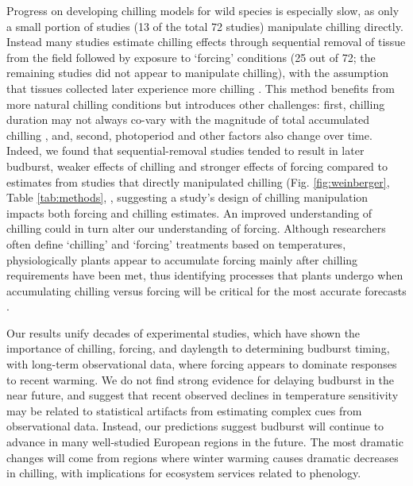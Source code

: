 \documentclass{article}
\begin{document}
\par Progress on developing chilling models for wild species is especially slow, as only a small portion of studies (13 of the total 72 studies) manipulate chilling directly. Instead many studies estimate chilling effects through sequential removal of tissue from the field followed by exposure to `forcing' conditions (25 out of 72; the remaining studies did not appear to manipulate chilling), with the assumption that tissues collected later experience more chilling \emph{\citep{weinberger1950}}. This method benefits from more natural chilling conditions but introduces other challenges: first, chilling duration may not always co-vary with the magnitude of total accumulated chilling \emph{\citep{dennis2003}}, and, second, photoperiod and other factors also change over time. Indeed, we found that sequential-removal studies tended to result in later budburst, weaker effects of chilling and stronger effects of forcing compared to estimates from studies that directly manipulated chilling (Fig. \ref{fig:weinberger}, Table \ref{tab:methods}, \emph{\citep{weinberger1950,polgar2013}}, suggesting a study's design of chilling manipulation impacts both forcing and chilling estimates. An improved understanding of chilling could in turn alter our understanding of forcing. Although researchers often define `chilling' and `forcing' treatments based on temperatures, physiologically plants appear to accumulate forcing mainly after chilling requirements have been met, thus identifying processes that plants undergo when accumulating chilling versus forcing will be critical for the most accurate forecasts \emph{\citep{chuine2016}}.


 \par Our results unify decades of experimental studies, which have shown the importance of chilling, forcing, and daylength to determining budburst timing, with long-term observational data, where forcing appears to dominate responses to recent warming. We do not find strong evidence for delaying budburst in the near future, and suggest that recent observed declines in temperature sensitivity may be related to statistical artifacts from estimating complex cues from observational data. Instead, our predictions suggest budburst will continue to advance in many well-studied European regions in the future. The most dramatic changes will come from regions where winter warming causes dramatic decreases in chilling, with implications for ecosystem services related to phenology. %
 
\end{document}
